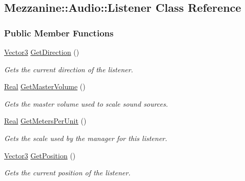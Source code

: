 \hypertarget{classMezzanine_1_1Audio_1_1Listener}{
\subsection{Mezzanine::Audio::Listener Class Reference}
\label{classMezzanine_1_1Audio_1_1Listener}
}
\subsubsection*{Public Member Functions}
\begin{DoxyCompactItemize}
\item 
\hyperlink{classMezzanine_1_1Vector3}{Vector3} \hyperlink{classMezzanine_1_1Audio_1_1Listener_a62979c5c6eb31f2c98b5c8d56cece662}{GetDirection} ()
\begin{DoxyCompactList}\small\item\em Gets the current direction of the listener. \item\end{DoxyCompactList}\item 
\hyperlink{namespaceMezzanine_a726731b1a7df72bf3583e4a97282c6f6}{Real} \hyperlink{classMezzanine_1_1Audio_1_1Listener_a9eab36fdf62509af37a4b7cb7286e302}{GetMasterVolume} ()
\begin{DoxyCompactList}\small\item\em Gets the master volume used to scale sound sources. \item\end{DoxyCompactList}\item 
\hyperlink{namespaceMezzanine_a726731b1a7df72bf3583e4a97282c6f6}{Real} \hyperlink{classMezzanine_1_1Audio_1_1Listener_ad566d30003eb6e0b5e2bc86eed63636b}{GetMetersPerUnit} ()
\begin{DoxyCompactList}\small\item\em Gets the scale used by the manager for this listener. \item\end{DoxyCompactList}\item 
\hyperlink{classMezzanine_1_1Vector3}{Vector3} \hyperlink{classMezzanine_1_1Audio_1_1Listener_ac1a707dd38254dc1d84b82350ac37127}{GetPosition} ()
\begin{DoxyCompactList}\small\item\em Gets the current position of the listener. \item\end{DoxyCompactList}\item 

\end{DoxyCompactItemize}
